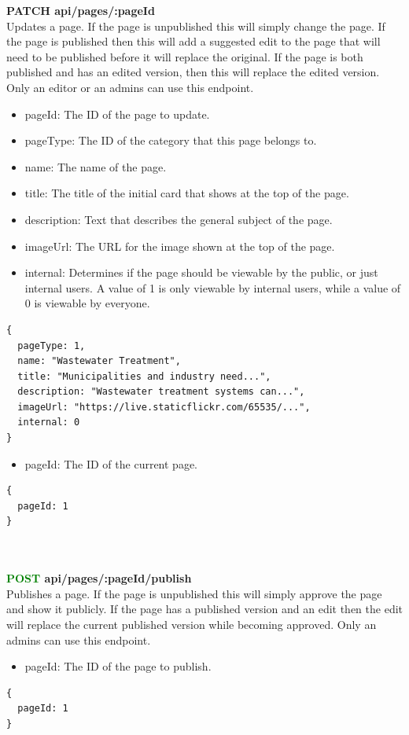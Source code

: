 \documentclass[onecolumn, draftclsnofoot,10pt, compsoc, usenames, dvipsnames]{IEEEtran}
\begin{document}
\noindent
\textbf{\textcolor{BlueGreen}{PATCH} api/pages/:pageId} \\
Updates a page. If the page is unpublished this will simply change the page. If the page is published then this will add a suggested edit to the page that will need to be published before it will replace the original. If the page is both published and has an edited version, then this will replace the edited version. Only an editor or an admins can use this endpoint.
\begin{itemize}
    \item pageId: The ID of the page to update.
    \item pageType: The ID of the category that this page belongs to.
    \item name: The name of the page.
    \item title: The title of the initial card that shows at the top of the page.
    \item description: Text that describes the general subject of the page.
    \item imageUrl: The URL for the image shown at the top of the page.
    \item internal: Determines if the page should be viewable by the public, or just internal users. A value of 1 is only viewable by internal users, while a value of 0 is viewable by everyone.
\end{itemize}
\begin{lstlisting}[caption=Example Request Body]
{
  pageType: 1,
  name: "Wastewater Treatment",
  title: "Municipalities and industry need...",
  description: "Wastewater treatment systems can...",
  imageUrl: "https://live.staticflickr.com/65535/...",
  internal: 0
}
\end{lstlisting}
\begin{itemize}
  \item pageId: The ID of the current page.
\end{itemize}
\begin{lstlisting}[caption=Example Response]
{ 
  pageId: 1
}
\end{lstlisting}
\\~\\


\noindent
\textbf{\textcolor{Green}{POST} api/pages/:pageId/publish} \\
Publishes a page. If the page is unpublished this will simply approve the page and show it publicly. If the page has a published version and an edit then the edit will replace the current published version while becoming approved. Only an admins can use this endpoint.
\begin{itemize}
    \item pageId: The ID of the page to publish.
\end{itemize}
\begin{lstlisting}[caption=Example Response]
{ 
  pageId: 1
}
\end{lstlisting}
\\~\\
\end{document}
